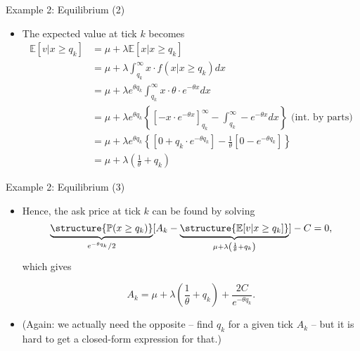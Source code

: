 \documentclass[english,10pt
,aspectratio=169
]{beamer}
\begin{document}
\begin{frame}{Example 2: Equilibrium (2)}
	\begin{itemize}
		\item The expected value at tick $k$ becomes
		\begin{align*}
		\mathbb{E}[v|x \geq q_k] & =  \mu + \lambda \mathbb{E}[x|x \geq q_k]\\
		&=\mu+ \lambda \int^\infty_{q_k} x \cdot f(x|x \geq q_k) dx\\
		&=\mu+ \lambda e^{\theta q_k} \int^\infty_{q_k} x \cdot \theta \cdot e^{-\theta x} dx\\
		& =  \mu+ \lambda e^{\theta q_k} \left\{\left[- x \cdot e^{-\theta x} \right]^\infty_{q_k} -\int^\infty_{q_k} -e^{-\theta x} dx   \right\}\text{ (int. by parts)} \\
		& =  \mu+ \lambda e^{\theta q_k} \left\{\left[0+ q_k \cdot  e^{-\theta q_k} \right] -\frac{1}{\theta}[0-e^{-\theta q_k}]   \right\} \\
		& = \mu + \lambda \left( \frac{1}{\theta }+ q_k \right)
		\end{align*}
	\end{itemize}
\end{frame}


\begin{frame}{Example 2: Equilibrium (3)}
	\begin{itemize}
		\item Hence, the ask price at tick $k$ can be found by solving
		\[
		\underbrace{\structure{\mathbb{P}(x \geq q_k)}}_{e^{-\theta q_k}/2}[A_k-\underbrace{\structure{\mathbb{E}[v|x \geq q_k]}}_{\mu + \lambda \left( \frac{1}{\theta }+ q_k \right)}] - C = 0,
		\]
		which gives
		\begin{block}{}
			\[
			A_k=\mu + \lambda \left( \frac{1}{\theta }+ q_k\right) + \frac{2C}{e^{-\theta q_k}}.
			\]
		\end{block}
		\item (Again: we actually need the opposite -- find $q_k$ for a given tick $A_k$ -- but it is hard to get a closed-form expression for that.)
	\end{itemize}
\end{frame}
\end{document}
